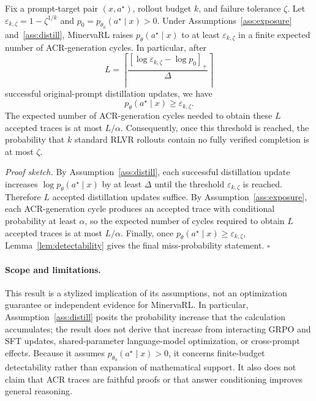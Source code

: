 \begin{theorem}
\label{thm:minervarl-bridging}
Fix a prompt-target pair $(x,a^\star)$, rollout budget $k$, and failure tolerance $\zeta$. Let
$\varepsilon_{k,\zeta}=1-\zeta^{1/k}$ and $p_0=p_{\theta_0}(a^\star\mid x)>0$. Under
Assumptions~\ref{ass:exposure} and~\ref{ass:distill}, MinervaRL raises
$p_\theta(a^\star\mid x)$ to at least $\varepsilon_{k,\zeta}$ in a finite expected number of
ACR-generation cycles. In particular, after
\begin{equation}
    L
    =
    \left\lceil
    \frac{\left[\log \varepsilon_{k,\zeta}-\log p_0\right]_+}{\Delta}
    \right\rceil
\end{equation}
successful original-prompt distillation updates, we have
\begin{equation}
    p_\theta(a^\star\mid x)\ge \varepsilon_{k,\zeta}.
\end{equation}
The expected number of ACR-generation cycles needed to obtain these $L$ accepted traces is at most
$L/\alpha$. Consequently, once this threshold is reached, the probability that $k$ standard RLVR
rollouts contain no fully verified completion is at most $\zeta$.
\end{theorem}

\noindent\emph{Proof sketch.}
By Assumption~\ref{ass:distill}, each successful distillation update increases
$\log p_\theta(a^\star\mid x)$ by at least $\Delta$ until the threshold
$\varepsilon_{k,\zeta}$ is reached. Therefore $L$ accepted distillation updates suffice. By
Assumption~\ref{ass:exposure}, each ACR-generation cycle produces an accepted trace with conditional probability
at least $\alpha$, so the expected number of cycles required to obtain $L$ accepted traces is at most
$L/\alpha$. Finally, once $p_\theta(a^\star\mid x)\ge\varepsilon_{k,\zeta}$,
Lemma~\ref{lem:detectability} gives the final miss-probability statement. \hfill$\square$

\paragraph{Scope and limitations.}
This result is a stylized implication of its assumptions, not an optimization guarantee or independent
evidence for MinervaRL. In particular, Assumption~\ref{ass:distill} posits the probability increase that
the calculation accumulates; the result does not derive that increase from interacting GRPO and SFT
updates, shared-parameter language-model optimization, or cross-prompt effects. Because it assumes
$p_{\theta_0}(a^\star\mid x)>0$, it concerns finite-budget detectability rather than expansion of
mathematical support. It also does not claim that ACR traces are faithful proofs or that answer
conditioning improves general reasoning.
